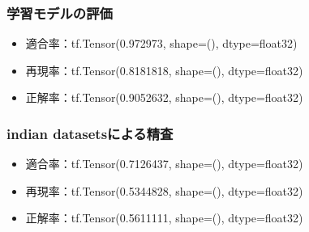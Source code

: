 \documentclass[a4paper, 11pt, titlepage]{jsarticle}
\begin{document}
\subsubsection{学習モデルの評価}
\begin{itemize}
\item 適合率：tf.Tensor(0.972973, shape=(), dtype=float32)
\item 再現率：tf.Tensor(0.8181818, shape=(), dtype=float32) 
\item 正解率：tf.Tensor(0.9052632, shape=(), dtype=float32)
\end{itemize}
\subsubsection{indian datasetsによる精査}
\begin{itemize}
\item 適合率：tf.Tensor(0.7126437, shape=(), dtype=float32)
\item 再現率：tf.Tensor(0.5344828, shape=(), dtype=float32) 
\item 正解率：tf.Tensor(0.5611111, shape=(), dtype=float32)
\end{itemize}

\clearpage
\end{document}
